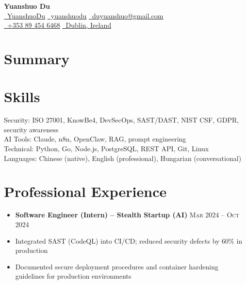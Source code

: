\documentclass{simpleresume}
\begin{document}
\begin{center}
  {\Large\sffamily\bfseries\color{namecolor} Yuanshuo Du}\\[0.12cm]
  {\sffamily\small
    \href{https://github.com/YuanshuoDu}{\color{accent}\faGithub\color{muted}\ YuanshuoDu}
    \quad\textbullet\quad
    \href{https://linkedin.com/in/yuanshuodu}{\color{accent}\faLinkedin\color{muted}\ yuanshuodu}
    \quad\textbullet\quad
    \href{https://mail.google.com/mail/?view=cm&to=duyuanshuo@gmail.com}{\color{accent}\faEnvelope\color{muted}\ duyuanshuo@gmail.com}
  }\\[0.06cm]
  {\sffamily\small\color{muted}
    \href{tel:+353894546468}{\color{accent}\faPhone\color{muted}\ +353 89 454 6468}
    \quad\textbullet\quad
    \href{https://www.google.com/maps/place/Dublin,+Ireland}{\color{accent}\faMapMarker\ Dublin, Ireland}
  }
\end{center}
\headerrule
\section{Summary}
\vspace{-0.05cm}
\vspace{-0.08cm}
\section{Skills}
\noindent
{\sffamily\fontsize{7.5}{8.8}\selectfont\color{secondary}
  Security: ISO 27001, KnowBe4, DevSecOps, SAST/DAST, NIST CSF, GDPR, security awareness\\[0.06cm]
  AI Tools: Claude, n8n, OpenClaw, RAG, prompt engineering\\[0.06cm]
  Technical: Python, Go, Node.js, PostgreSQL, REST API, Git, Linux\\[0.06cm]
  Languages: Chinese (native), English (professional), Hungarian (conversational)
}
\section{Professional Experience}
\begin{itemize}
  \item\textbf{Software Engineer (Intern) -- Stealth Startup (AI)}
    \hfill{\sffamily\scshape\small\color{muted}Mar 2024 -- Oct 2024}
  \item Integrated SAST (CodeQL) into CI/CD; reduced security defects by 60\% in production
  \item Documented secure deployment procedures and container hardening guidelines for production environments
\end{itemize}
\end{document}
